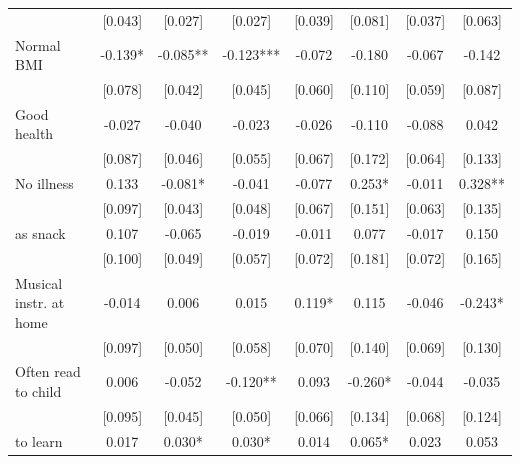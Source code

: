 \documentclass[12pt]{article}
\begin{document}
\begin{table}[ht]
\begin{center}
\begin{adjustbox}{width=1.2\textwidth,center=\textwidth}
\begin{tabular}{lccccccc}
 & [0.043] & [0.027] & [0.027] & [0.039] & [0.081] & [0.037] & [0.063]\\
{Normal BMI } & {-0.139{*} } & {-0.085{*}{*} } & {-0.123{*}{*}{*} } & {-0.072 } & {-0.180 } & {-0.067 } & {-0.142 }\\
 & [0.078] & [0.042] & [0.045] & [0.060] & [0.110] & [0.059] & [0.087]\\
{Good health } & {-0.027 } & {-0.040 } & {-0.023 } & {-0.026 } & {-0.110 } & {-0.088 } & {0.042 }\\
 & [0.087] & [0.046] & [0.055] & [0.067] & [0.172] & [0.064] & [0.133]\\
{No illness } & {0.133 } & {-0.081{*} } & {-0.041 } & {-0.077 } & {0.253{*} } & {-0.011 } & {0.328{*}{*} }\\
 & [0.097] & [0.043] & [0.048] & [0.067] & [0.151] & [0.063] & [0.135]\\
{%
as snack } & {0.107 } & {-0.065 } & {-0.019 } & {-0.011 } & {0.077 } & {-0.017 } & {0.150 }\\
 & [0.100] & [0.049] & [0.057] & [0.072] & [0.181] & [0.072] & [0.165]\\
{Musical instr. at home } & {-0.014 } & {0.006 } & {0.015 } & {0.119{*} } & {0.115 } & {-0.046 } & {-0.243{*} }\\
 & [0.097] & [0.050] & [0.058] & [0.070] & [0.140] & [0.069] & [0.130]\\
{Often read to child } & {0.006 } & {-0.052 } & {-0.120{*}{*} } & {0.093 } & {-0.260{*} } & {-0.044 } & {-0.035 }\\
 & [0.095] & [0.045] & [0.050] & [0.066] & [0.134] & [0.068] & [0.124]\\
{%
to learn } & {0.017 } & {0.030{*} } & {0.030{*} } & {0.014 } & {0.065{*} } & {0.023 } & {0.053 }\\

\end{tabular}
\end{adjustbox}
\end{center}
\end{table}
\end{document}
